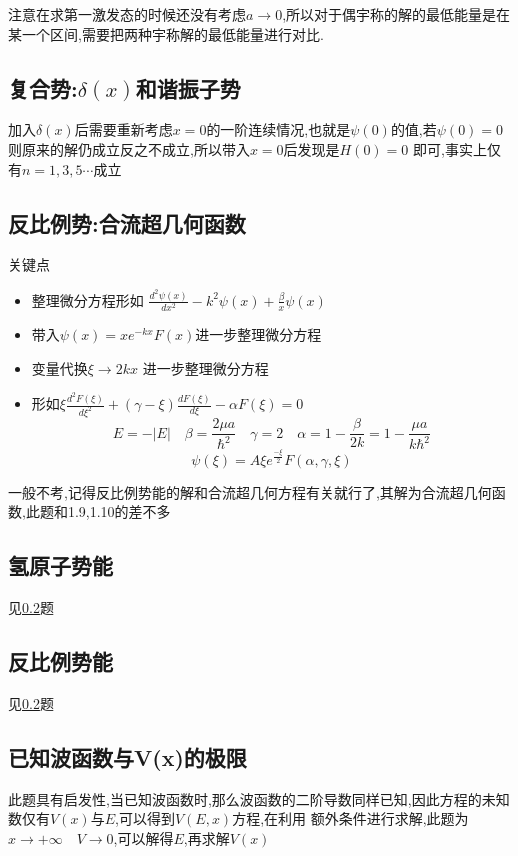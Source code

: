 \documentclass{article}
\begin{document}
        注意在求第一激发态的时候还没有考虑$a \to 0$,所以对于偶宇称的解的最低能量是在某一个区间,需要把两种宇称解的最低能量进行对比.

    \subsection{复合势:\texorpdfstring{$\delta(x)$}{}和谐振子势}
        加入$\delta(x)$后需要重新考虑$x=0$的一阶连续情况,也就是$\psi(0)$的值,若$\psi(0)=0$则原来的解仍成立反之不成立,所以带入$x=0$后发现是$H(0)=0$
        即可,事实上仅有$n=1,3,5\cdots$成立

    \subsection{反比例势:合流超几何函数}\label{subsec:1.8}
        关键点
        \begin{itemize}
            \item 整理微分方程形如 \quad $\frac{d^{2}\psi(x)}{d x^{2}}-k^{2}\psi(x)+\frac{\beta}{x}\psi(x)$
            \item 带入$\psi(x)=x e^{-kx}F(x)$进一步整理微分方程
            \item 变量代换$\xi \to 2kx$ 进一步整理微分方程
            \item 形如\quad $\xi \frac{d^{2}F(\xi)}{d \xi^{2}}+(\gamma-\xi)\frac{dF(\xi)}{d \xi}-\alpha F(\xi)=0$  
                  $$ E=-|E| \quad \beta=\frac{2\mu a}{\hbar^{2}} \quad \gamma=2 \quad \alpha=1-\frac{\beta}{2k}=1-\frac{\mu a}{k \hbar^{2}}$$ 
                  $$ \psi(\xi)=A\xi e^{\frac{-\xi}{2}} F(\alpha,\gamma,\xi)   $$
        \end{itemize}
        一般不考,记得反比例势能的解和合流超几何方程有关就行了,其解为合流超几何函数,此题和1.9,1.10的差不多
    
    \subsection{氢原子势能}
        见\ref{subsec:1.8}题

    \subsection{反比例势能}
        见\ref{subsec:1.8}题

    \subsection{已知波函数与\texorpdfstring{V(x)}{}的极限}\label{subsec:1.11}
        此题具有启发性,当已知波函数时,那么波函数的二阶导数同样已知,因此\sdr 方程的未知数仅有$V(x)$与$E$,可以得到$V(E,x)$方程,在利用
        额外条件进行求解,此题为$x \to +\infty \quad V \to 0$,可以解得$E$,再求解$V(x)$ 
\end{document}
